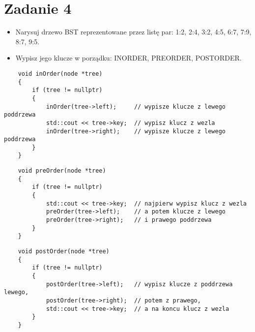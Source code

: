 \documentclass{article}
\begin{document}
    \section*{Zadanie 4}

    \begin{itemize}
        \item Narysuj drzewo BST reprezentowane przez listę par: 1:2, 2:4, 3:2, 4:5, 6:7, 7:9, 8:7, 9:5.
        \item Wypisz jego klucze w porządku: INORDER, PREORDER, POSTORDER.
    \end{itemize}

    \begin{lstlisting}
    void inOrder(node *tree)
    {
        if (tree != nullptr)
        {
            inOrder(tree->left);	 // wypisze klucze z lewego poddrzewa
            std::cout << tree->key;  // wypisz klucz z wezla
            inOrder(tree->right);	 // wypisze klucze z lewego poddrzewa
        }
    }
    \end{lstlisting}

    \begin{lstlisting}
    void preOrder(node *tree)
    {
        if (tree != nullptr)
        {
            std::cout << tree->key;  // najpierw wypisz klucz z wezla
            preOrder(tree->left);	 // a potem klucze z lewego
            preOrder(tree->right);	 // i prawego poddrzewa
        }
    }
    \end{lstlisting}

    \begin{lstlisting}
    void postOrder(node *tree)
    {
        if (tree != nullptr)
        {
            postOrder(tree->left);	 // wypisz klucze z poddrzewa lewego,
            postOrder(tree->right);	 // potem z prawego,
            std::cout << tree->key;  // a na koncu klucz z wezla
        }
    }
    \end{lstlisting}
\end{document}
